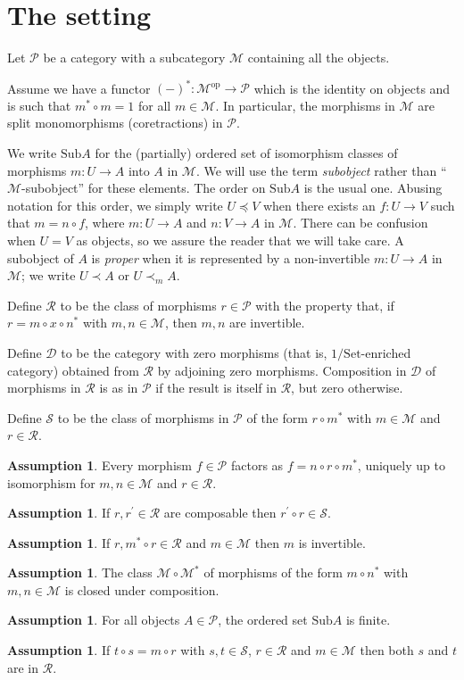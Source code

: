 \documentclass[a4paper,12pt,reqno]{amsart}
\theoremstyle{definition}
\newtheorem{assumption}[theorem]{Assumption}
\theoremstyle{fact}
\theoremstyle{genquest}
\theoremstyle{step}
\newcommand{\dd}{\colon}
\newcommand{\ra}{\rightarrow}
\def\CD{{\mathscr D}}
\def\CM{{\mathscr M}}
\def\CP{{\mathscr P}}
\def\CR{{\mathscr R}}
\def\CS{{\mathscr S}}
\begin{document}
\section{The setting}\label{setting}

Let $\CP$ be a category with a subcategory $\CM$ containing all the objects.

Assume we have a functor $(-)^*\dd \CM^{\mathrm{op}} \ra \CP$
which is the identity on objects and is 
such that $m^*\circ m=1$ for all $m\in \CM$.
In particular, the morphisms in $\CM$ are split monomorphisms (coretractions)
in $\CP$. 

We write $\mathrm{Sub}A$ for the (partially) ordered set of isomorphism 
classes of morphisms
$m\dd U\ra A$ into $A$ in $\CM$. We will use the term {\em subobject} 
rather than ``$\CM$-subobject'' for these elements. 
The order on $\mathrm{Sub}A$ is the usual one. 
Abusing notation for this order, we simply write $U\preceq V$ when there 
exists an $f \dd U\ra V$ such that $m=n\circ f$, where $m\dd U\ra A$ and $n \dd V\ra A$ in $\CM$. 
There can be confusion when $U=V$ as objects, so we assure the reader that we will take care.
A subobject of $A$ is {\em proper} when it is represented by a non-invertible $m\dd U\ra A$
in $\CM$; we write $U\prec A$ or $U\prec_m A$. 

Define $\CR$ to be the class of morphisms $r\in \CP$ with the property that, if $r = m\circ x \circ n^*$ with $m, n \in \CM$, then $m, n$ are invertible. 

Define $\CD$ to be the category with zero morphisms (that is, $1/\mathrm{Set}$-enriched
category) obtained from $\CR$ by adjoining zero morphisms.
Composition in $\CD$ of morphisms in $\CR$ is as in $\CP$ if the result is itself
in $\CR$, but zero otherwise. 

Define $\CS$ to be the class of morphisms in $\CP$ of the form $r\circ m^*$ with
$m\in \CM$ and $r\in \CR$. 

\begin{assumption}\label{ass1}
Every morphism $f\in \CP$ factors as $f=n\circ r\circ m^*$, 
uniquely up to isomorphism for $m,n\in \CM$ and $r\in \CR$.
\end{assumption}
\begin{assumption}\label{ass2}
If $r, r^{\prime}\in \CR$ are composable then $r^{\prime}\circ r \in \CS$. 
\end{assumption}
\begin{assumption}\label{ass3}
If $r,m^*\circ r \in \CR$ and $m\in \CM$ then $m$ is invertible.
\end{assumption}
\begin{assumption}\label{ass4}
The class $\CM \circ \CM^*$ of morphisms of the form $m\circ n^*$ with $m,n\in \CM$ is closed under composition.
\end{assumption}
\begin{assumption}\label{ass5}
For all objects $A\in \CP$, the ordered set $\mathrm{Sub}A$ is finite. 
\end{assumption}
\begin{assumption}\label{ass6}
If $t\circ s = m\circ r$ with $s,t\in \CS$, $r\in \CR$ and $m\in \CM$ then both $s$ and
$t$ are in $\CR$. 
\end{assumption}
\end{document}
